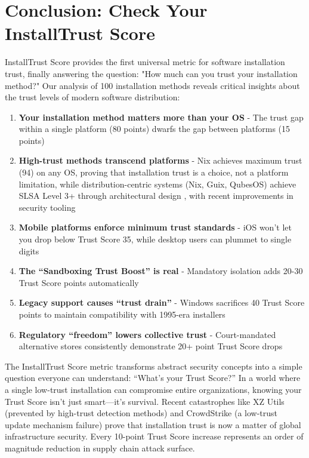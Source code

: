 \documentclass[11pt,a4paper]{article}
\begin{document}
\section{Conclusion: Check Your InstallTrust Score}

InstallTrust Score provides the first universal metric for software installation trust, finally answering the question: "How much can you trust your installation method?" Our analysis of 100 installation methods reveals critical insights about the trust levels of modern software distribution:

\begin{enumerate}
    \item \textbf{Your installation method matters more than your OS} - The trust gap within a single platform (80 points) dwarfs the gap between platforms (15 points)
    
    \item \textbf{High-trust methods transcend platforms} - Nix achieves maximum trust (94) on any OS, proving that installation trust is a choice, not a platform limitation, while distribution-centric systems (Nix, Guix, QubesOS) achieve SLSA Level 3+ through architectural design \cite{google2021slsa}, with recent improvements in security tooling \cite{rustup2024security,golang2024modules}
    
    \item \textbf{Mobile platforms enforce minimum trust standards} - iOS won't let you drop below Trust Score 35, while desktop users can plummet to single digits
    
    \item \textbf{The ``Sandboxing Trust Boost'' is real} - Mandatory isolation adds 20-30 Trust Score points automatically
    
    \item \textbf{Legacy support causes ``trust drain''} - Windows sacrifices 40 Trust Score points to maintain compatibility with 1995-era installers
    
    \item \textbf{Regulatory ``freedom'' lowers collective trust} - Court-mandated alternative stores consistently demonstrate 20+ point Trust Score drops
\end{enumerate}

The InstallTrust Score metric transforms abstract security concepts into a simple question everyone can understand: ``What's your Trust Score?'' In a world where a single low-trust installation can compromise entire organizations, knowing your Trust Score isn't just smart—it's survival. Recent catastrophes like XZ Utils (prevented by high-trust detection methods) \cite{xz2024backdoor} and CrowdStrike (a low-trust update mechanism failure) \cite{crowdstrike2024outage} prove that installation trust is now a matter of global infrastructure security. Every 10-point Trust Score increase represents an order of magnitude reduction in supply chain attack surface.
\end{document}

